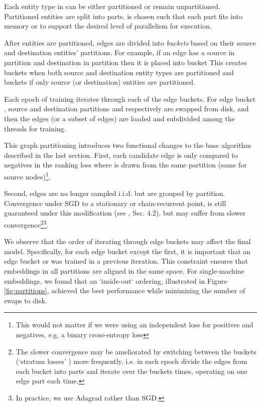 \documentclass{article}
\begin{document}
Each entity type in  can be either partitioned or remain unpartitioned. Partitioned entities are split into  parts.  is chosen such that each part fits into memory or to support the desired level of parallelism for execution.

After entities are partitioned, edges are divided into \textit{buckets} based on their source and destination entities' partitions. For example, if an edge has a source in partition  and destination in partition  then it is placed into bucket  This creates  buckets when both source and destination entity types are partitioned and  buckets if only source (or destination) entities are partitioned.

Each epoch of training iterates through each of the edge buckets. For edge bucket , source and destination partitions  and  respectively are swapped from disk, and then the edges (or a subset of edges) are loaded and subdivided among the threads for training.

This graph partitioning introduces two functional changes to the base algorithm described in the last section. First, each candidate edge  is only compared to negatives  in the ranking loss where  is drawn from the same partition (same for source nodes)\footnote{This would not matter if we were using an independent loss for positives and negatives, e.g. a binary cross-entropy loss}. 

Second, edges are no longer sampled i.i.d. but are grouped by partition. Convergence under SGD to a stationary or chain-recurrent point, is still guaranteed under this modification (see \cite{Gemulla:2011:LMF:2020408.2020426}, Sec. 4.2), but may suffer from slower convergence\footnote{The slower convergence may be ameliorated by switching between the buckets (`stratum losses' \cite{Gemulla:2011:LMF:2020408.2020426}) more frequently, i.e. in each epoch divide the edges from each bucket into  parts and iterate over the buckets  times, operating on one edge part each time.}\footnote{In practice, we use Adagrad rather than SGD.}.


We observe that the order of iterating through edge buckets may affect the final model. Specifically, for each edge bucket  except the first, it is important that an edge bucket  or  was trained in a previous iteration. This constraint ensures that embeddings in all partitions are aligned in the same space. For single-machine embeddings, we found that an `inside-out` ordering, illustrated in Figure \ref{fig:partitions}, achieved the best performance while minimizing the number of swaps to disk. 
\end{document}
